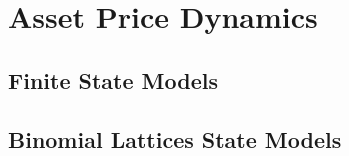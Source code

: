 
\chapter{Asset Price Dynamics}



\section{Finite State Models}





\section{Binomial Lattices State Models}


